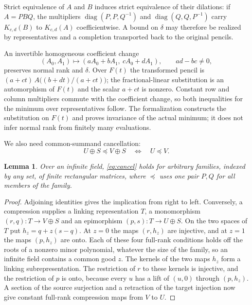 \documentclass[11pt]{article}
\newtheorem{lemma}{Lemma}
\newcommand{\cmp}{\preceq}
\newcommand{\Ft}{F(t)}
\begin{document}
Strict equivalence of $A$ and $B$ induces strict equivalence of their dilations: if $A=PBQ$, the multipliers $\operatorname{diag}(P,P,Q^{-1})$ and $\operatorname{diag}(Q,Q,P^{-1})$ carry $K_{c,d}(B)$ to $K_{c,d}(A)$ coefficientwise. A bound on $\delta$ may therefore be realized by representatives and a completion transported back to the original pencils.

An invertible homogeneous coefficient change
\[
(A_0,A_1)\longmapsto(aA_0+bA_1,\ cA_0+dA_1),\qquad ad-bc\ne0,
\]
preserves normal rank and $\delta$. Over $\Ft$ the transformed pencil is $(a+ct)\,A\bigl((b+dt)/(a+ct)\bigr)$; the fractional-linear substitution is an automorphism of $\Ft$ and the scalar $a+ct$ is nonzero. Constant row and column multipliers commute with the coefficient change, so both inequalities for the minimum over representatives follow. The formalization constructs the substitution on $\Ft$ and proves invariance of the actual minimum; it does not infer normal rank from finitely many evaluations.

We also need common-summand cancellation:
\begin{equation}\label{eq:cancel}
U\oplus S\cmp V\oplus S\quad\Longleftrightarrow\quad U\cmp V.
\end{equation}

\begin{lemma}\label{lem:cancel}
Over an infinite field, \eqref{eq:cancel} holds for arbitrary families, indexed by any set, of finite rectangular matrices, where $\cmp$ uses one pair $P,Q$ for all members of the family.
\end{lemma}

\begin{proof}
Adjoining identities gives the implication from right to left. Conversely, a compression supplies a linking representation $T$, a monomorphism $(r,q)\colon T\to V\oplus S$ and an epimorphism $(p,s)\colon T\to U\oplus S$. On the two spaces of $T$ put $h_z=q+z(s-q)$. At $z=0$ the maps $(r,h_z)$ are injective, and at $z=1$ the maps $(p,h_z)$ are onto. Each of these four full-rank conditions holds off the roots of a nonzero minor polynomial, whatever the size of the family, so an infinite field contains a common good $z$. The kernels of the two maps $h_z$ form a linking subrepresentation. The restriction of $r$ to these kernels is injective, and the restriction of $p$ is onto, because every $u$ has a lift of $(u,0)$ through $(p,h_z)$. A section of the source surjection and a retraction of the target injection now give constant full-rank compression maps from $V$ to $U$.
\end{proof}
\end{document}
